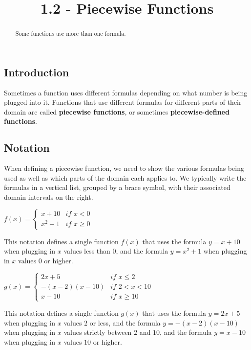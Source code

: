 \documentclass{ximera}
\title{1.2 - Piecewise Functions}
\begin{document}
\begin{abstract}
  Some functions use more than one formula.
\end{abstract}
\maketitle

\subsection*{Introduction}
Sometimes a function uses different formulas depending on what number is being plugged into it. Functions that use different formulas for different parts of their domain are called \textbf{piecewise functions}, or sometimes \textbf{piecewise-defined functions}.

\subsection*{Notation}
When defining a piecewise function, we need to show the various formulas being used as well as which parts of the domain each applies to. We typically write the formulas in a vertical list, grouped by a brace symbol, with their associated domain intervals on the right.

\begin{example}
$f(x)=\begin{cases} x+10 &  \textit{if } x<0\\x^2+1 &  \textit{if } x\geq 0\end{cases}$

This notation defines a single function $f(x)$ that uses the formula $y=x+10$ when plugging in $x$ values less than $0$, and the formula $y=x^2+1$ when plugging in $x$ values $0$ or higher.
\end{example}

\begin{example}
$g(x)=\begin{cases} 2x+5 & \textit{if }x\leq 2\\ -(x-2)(x-10) & \textit{if } 2<x<10\\ x-10 & \textit{if } x\geq 10\end{cases}$

This notation defines a single function $g(x)$ that uses the formula $y=2x+5$ when plugging in $x$ values $2$ or less, and the formula $y=-(x-2)(x-10)$ when plugging in $x$ values strictly between $2$ and $10$, and the formula $y=x-10$ when plugging in $x$ values $10$ or higher.
\end{example}
\end{document}
